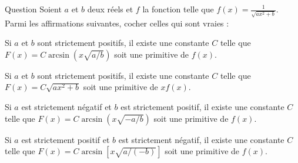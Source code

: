 \begin{multi}{Question}
Soient \(a\) et \(b\) deux réels et \(f\) la fonction telle que \(\displaystyle f(x)=\frac{1}{\sqrt{ax^2+b}}\). Parmi les affirmations suivantes, cocher celles qui sont vraies :

    \item Si \(a\) et \(b\) sont strictement positifs, il existe une constante \(C\) telle que \(F(x)=C\arcsin \left(x\sqrt{a/b}\right)\) soit une primitive de \(f(x)\).
    \item* Si \(a\) et \(b\) sont strictement positifs, il existe une constante \(C\) telle que \(F(x)=C\sqrt{ax^2+b}\) soit une primitive de \(xf(x)\).
    \item* Si \(a\) est strictement négatif et \(b\) est strictement positif, il existe une constante \(C\) telle que \(F(x)=C\arcsin \left(x\sqrt{-a/b}\right)\) soit une primitive de \(f(x)\).
    \item Si \(a\) est strictement positif et \(b\) est strictement négatif, il existe une constante \(C\) telle que \(F(x)=C\arcsin \left[x\sqrt{a/(-b)}\right]\) soit une primitive de \(f(x)\).
\end{multi}
